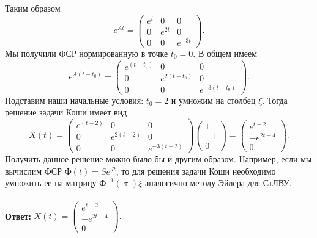 \documentclass[a4paper, 12pt]{article}
\newcommand{\FI}{\text{Ф}}
\begin{document}
Таким образом $$e^{At} = \begin{pmatrix}
	e^t & 0 & 0\\
	0 & e^{2t} & 0\\
	0 & 0 & e^{-3t}
\end{pmatrix}.$$
Мы получили ФСР нормированную в точке $t_0 = 0$. В общем имеем $$e^{A(t-t_0)} = \begin{pmatrix}
	e^{(t-t_0)} & 0 & 0\\
	0 & e^{2(t-t_0)} & 0\\
	0 & 0 & e^{-3(t-t_0)}
\end{pmatrix}.$$
Подставим наши начальные условия: $t_0 = 2$ и умножим на столбец $\xi$. Тогда решение задачи Коши имеет вид
$$X(t) = \begin{pmatrix}
	e^{(t-2)} & 0 & 0\\
	0 & e^{2(t-2)} & 0\\
	0 & 0 & e^{-3(t-2)}
\end{pmatrix}\begin{pmatrix}
1 \\ -1 \\ 0
\end{pmatrix} = \begin{pmatrix}
e^{t-2}\\
-e^{2t-4}\\
0
\end{pmatrix}.$$
Получить данное решение можно было бы и другим образом. Например, если мы вычислим ФСР $\FI(t) = Se^{Jt}$, то для решения задачи Коши необходимо умножить ее на матрицу $\FI^{-1}(\uptau)\xi$ аналогично методу Эйлера для СтЛВУ.\\\\
\textbf{Ответ:} $X(t) = \begin{pmatrix}
	e^{t-2}\\
	-e^{2t-4}\\
	0
\end{pmatrix}.$
\end{document}
